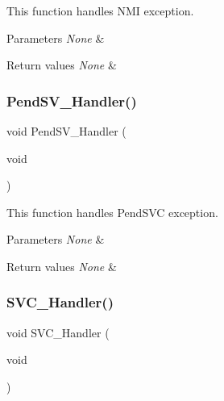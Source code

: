 This function handles N\+MI exception. 


\begin{DoxyParams}{Parameters}
{\em None} & \\
\hline
\end{DoxyParams}

\begin{DoxyRetVals}{Return values}
{\em None} & \\
\hline
\end{DoxyRetVals}
\mbox{\label{group___template___project_ga6303e1f258cbdc1f970ce579cc015623}} 
\subsubsection{\texorpdfstring{Pend\+S\+V\+\_\+\+Handler()}{PendSV\_Handler()}}
{\footnotesize\ttfamily void Pend\+S\+V\+\_\+\+Handler (\begin{DoxyParamCaption}\item[{void}]{ }\end{DoxyParamCaption})}



This function handles Pend\+S\+VC exception. 


\begin{DoxyParams}{Parameters}
{\em None} & \\
\hline
\end{DoxyParams}

\begin{DoxyRetVals}{Return values}
{\em None} & \\
\hline
\end{DoxyRetVals}
\mbox{\label{group___template___project_ga3e5ddb3df0d62f2dc357e64a3f04a6ce}} 
\subsubsection{\texorpdfstring{S\+V\+C\+\_\+\+Handler()}{SVC\_Handler()}}
{\footnotesize\ttfamily void S\+V\+C\+\_\+\+Handler (\begin{DoxyParamCaption}\item[{void}]{ }\end{DoxyParamCaption})}



